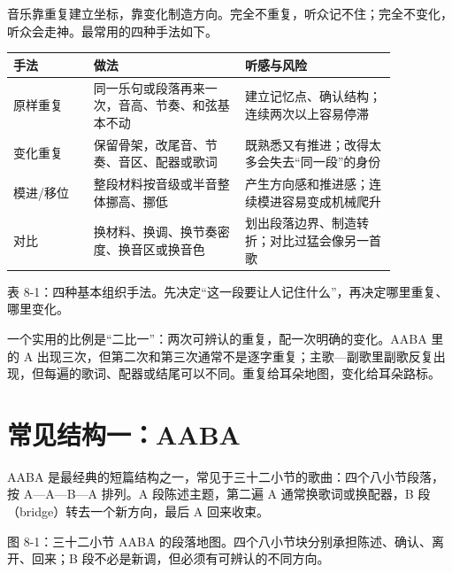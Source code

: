 音乐靠重复建立坐标，靠变化制造方向。完全不重复，听众记不住；完全不变化，听众会走神。最常用的四种手法如下。

\begin{center}
\small
\begin{tabular}{p{0.18\linewidth}p{0.34\linewidth}p{0.34\linewidth}}
\toprule
手法 & 做法 & 听感与风险 \\
\midrule
原样重复 & 同一乐句或段落再来一次，音高、节奏、和弦基本不动 & 建立记忆点、确认结构；连续两次以上容易停滞 \\
变化重复 & 保留骨架，改尾音、节奏、音区、配器或歌词 & 既熟悉又有推进；改得太多会失去“同一段”的身份 \\
模进/移位 & 整段材料按音级或半音整体挪高、挪低 & 产生方向感和推进感；连续模进容易变成机械爬升 \\
对比 & 换材料、换调、换节奏密度、换音区或换音色 & 划出段落边界、制造转折；对比过猛会像另一首歌 \\
\bottomrule
\end{tabular}

表 8-1：四种基本组织手法。先决定“这一段要让人记住什么”，再决定哪里重复、哪里变化。
\end{center}

一个实用的比例是“二比一”：两次可辨认的重复，配一次明确的变化。AABA 里的 A 出现三次，但第二次和第三次通常不是逐字重复；主歌—副歌里副歌反复出现，但每遍的歌词、配器或结尾可以不同。重复给耳朵地图，变化给耳朵路标。

\section{常见结构一：AABA}

AABA 是最经典的短篇结构之一，常见于三十二小节的歌曲：四个八小节段落，按 A—A—B—A 排列。A 段陈述主题，第二遍 A 通常换歌词或换配器，B 段（bridge）转去一个新方向，最后 A 回来收束。

\begin{center}
\begin{minipage}{0.94\linewidth}
\centering
{}

图 8-1：三十二小节 AABA 的段落地图。四个八小节块分别承担陈述、确认、离开、回来；B 段不必是新调，但必须有可辨认的不同方向。
\end{minipage}
\end{center}


